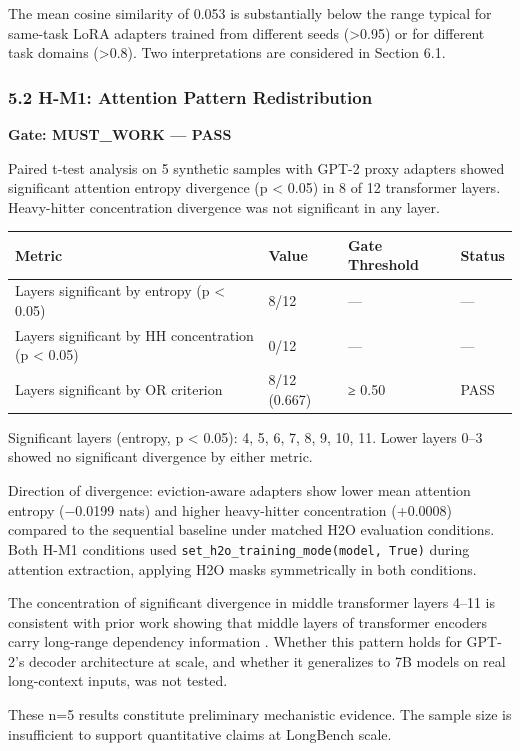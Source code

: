 The mean cosine similarity of 0.053 is substantially below the range typical for same-task LoRA adapters trained from different seeds (>0.95) or for different task domains (>0.8). Two interpretations are considered in Section 6.1.

\subsubsection{5.2 H-M1: Attention Pattern Redistribution}

\textbf{Gate: MUST_WORK — PASS}

Paired t-test analysis on 5 synthetic samples with GPT-2 proxy adapters showed significant attention entropy divergence (p < 0.05) in 8 of 12 transformer layers. Heavy-hitter concentration divergence was not significant in any layer.

\begin{table}[htbp]
\centering
\begin{tabular}{llll}
\toprule
Metric & Value & Gate Threshold & Status \\
\midrule
Layers significant by entropy (p < 0.05) & 8/12 & — & — \\
Layers significant by HH concentration (p < 0.05) & 0/12 & — & — \\
Layers significant by OR criterion & 8/12 (0.667) & ≥ 0.50 & PASS \\
\bottomrule
\end{tabular}
\end{table}

Significant layers (entropy, p < 0.05): 4, 5, 6, 7, 8, 9, 10, 11. Lower layers 0–3 showed no significant divergence by either metric.

Direction of divergence: eviction-aware adapters show lower mean attention entropy (−0.0199 nats) and higher heavy-hitter concentration (+0.0008) compared to the sequential baseline under matched H2O evaluation conditions. Both H-M1 conditions used \texttt{set_h2o_training_mode(model, True)} during attention extraction, applying H2O masks symmetrically in both conditions.

The concentration of significant divergence in middle transformer layers 4–11 is consistent with prior work showing that middle layers of transformer encoders carry long-range dependency information \citep{Clarketal2019}. Whether this pattern holds for GPT-2's decoder architecture at scale, and whether it generalizes to 7B models on real long-context inputs, was not tested.

These n=5 results constitute preliminary mechanistic evidence. The sample size is insufficient to support quantitative claims at LongBench scale.

